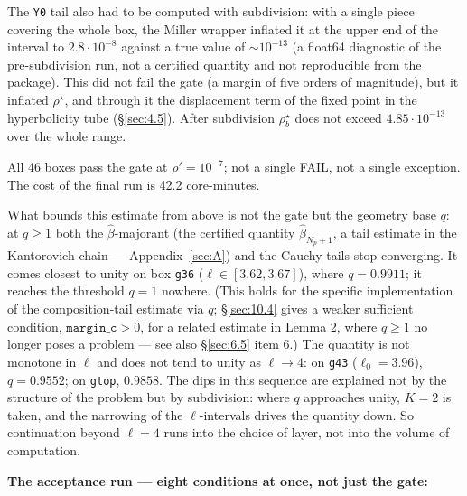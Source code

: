 The \texttt{Y0} tail also had to be computed with subdivision: with a single piece covering the whole box, the Miller wrapper inflated it at the upper end of the interval to $2.8\cdot 10^{-8}$ against a true value of $\sim 10^{-13}$
(a float64 diagnostic of the pre-subdivision run, not a certified quantity and
not reproducible from the package). This did not fail the gate (a margin of five orders of magnitude), but it inflated $\rho^{\star}$, and through it the displacement term of the fixed point in the hyperbolicity tube (\S\ref{sec:4.5}). After subdivision $\rho^{\star}_{b}$ does not exceed $4.85\cdot 10^{-13}$ over the whole range.

All 46 boxes pass the gate at $\rho' = 10^{-7}$; not a single FAIL, not a single exception. The cost of the final run is 42.2 core-minutes.

What bounds this estimate from above is not the gate but the geometry base $q$: at $q \ge 1$ both the $\widehat{\beta}$-majorant (the certified quantity $\widehat{\beta}_{N_{p}+1}$, a tail estimate in the Kantorovich chain --- Appendix~\ref{sec:A}) and the Cauchy tails stop converging. It comes closest to unity on box \texttt{g36} ($\ell \in [3.62, 3.67]$), where $q = 0.9911$; it reaches the threshold $q = 1$ nowhere. (This holds for the specific implementation of the composition-tail estimate via $q$; \S\ref{sec:10.4} gives a weaker sufficient condition, $\texttt{margin\_c} > 0$, for a related estimate in Lemma 2, where $q \ge 1$ no longer poses a problem --- see also \S\ref{sec:6.5} item 6.) The quantity is not monotone in $\ell$ and does not tend to unity as $\ell \to 4$: on \texttt{g43} ($\ell_{0} = 3.96$), $q = 0.9552$; on \texttt{gtop}, $0.9858$. The dips in this sequence are explained not by the structure of the problem but by subdivision: where $q$ approaches unity, $K = 2$ is taken, and the narrowing of the $\ell$-intervals drives the quantity down. So continuation beyond $\ell = 4$ runs into the choice of layer, not into the volume of computation.

\textbf{The acceptance run --- eight conditions at once, not just the gate:}

